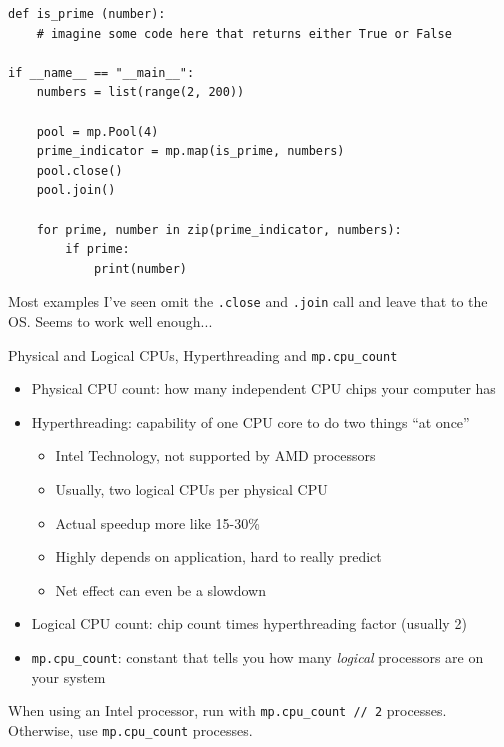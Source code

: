 \begin{frame}[fragile]
%
\begin{codebox}
\begin{verbatim}
def is_prime (number):
    # imagine some code here that returns either True or False

if __name__ == "__main__":
    numbers = list(range(2, 200))
    
    pool = mp.Pool(4)
    prime_indicator = mp.map(is_prime, numbers)
    pool.close()
    pool.join()
    
    for prime, number in zip(prime_indicator, numbers):
        if prime:
            print(number)
\end{verbatim}
\end{codebox}
%
\begin{hintbox}
\footnotesize
Most examples I've seen omit the \texttt{.close} and \texttt{.join} call and leave that to the OS. Seems to work well enough...
\end{hintbox}
%
\end{frame}


\begin{frame}{Physical and Logical CPUs, Hyperthreading and \texttt{mp.cpu\_count}}
%
\begin{itemize}
\item Physical CPU count: how many independent CPU chips your computer has
\item Hyperthreading: capability of one CPU core to do two things \enquote{at once} 
	\begin{itemize}
	\item Intel Technology, not supported by AMD processors
	\item Usually, two logical CPUs per physical CPU
	\item Actual speedup more like 15-30\%
	\item Highly depends on application, hard to really predict
	\item Net effect can even be a slowdown
	\end{itemize}
\item Logical CPU count: chip count times hyperthreading factor (usually 2)
\item \texttt{mp.cpu\_count}: constant that tells you how many \emph{logical} processors are on your system
\end{itemize}
%
\begin{hintbox}
When using an Intel processor, run with \texttt{mp.cpu\_count // 2} processes.\\
Otherwise, use \texttt{mp.cpu\_count} processes.
\end{hintbox}
%
\end{frame}

